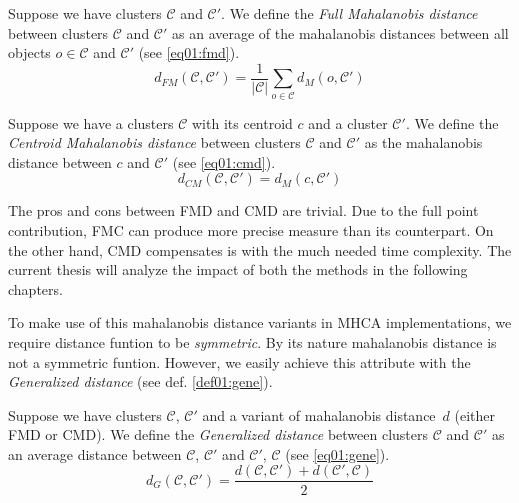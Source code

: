 \begin{defn}
	Suppose we have clusters $\mathcal{C}$ and $\mathcal{C}'$. We define the \emph{Full Mahalanobis distance} between clusters $\mathcal{C}$ and $\mathcal{C}'$ as an average of the mahalanobis distances between all objects $o \in \mathcal{C}$ and $\mathcal{C}'$ (see \ref{eq01:fmd}).
	\begin{equation}\label{eq01:fmd}
	d_{FM}(\mathcal{C},\mathcal{C}') =\frac{1}{|\mathcal{C}|}\sum_{o\in\mathcal{C}}{d_M(o,\mathcal{C}')}
	\end{equation}
	\label{def01:fmd}
\end{defn}

\begin{defn}
	Suppose we have a clusters $\mathcal{C}$ with its centroid $c$ and a cluster $\mathcal{C}'$. We define the \emph{Centroid Mahalanobis distance} between clusters $\mathcal{C}$ and $\mathcal{C}'$ as the mahalanobis distance between $c$ and $\mathcal{C}'$ (see \ref{eq01:cmd}).
	\begin{equation}\label{eq01:cmd}
	d_{CM}(\mathcal{C},\mathcal{C}')=d_M(c,\mathcal{C}')
	\end{equation}
	\label{def01:cmd}
\end{defn}


The pros and cons between FMD and CMD are trivial. Due to the full point contribution, FMC can produce more precise measure than its counterpart. On the other hand, CMD compensates is with the much needed time complexity. The current thesis will analyze the impact of both the methods in the following chapters.

\vspace{0.5cm}

To make use of this mahalanobis distance variants in MHCA implementations, we require distance funtion to be \emph{symmetric}. By its nature mahalanobis distance is not a symmetric funtion. However, we easily achieve this attribute with the \emph{Generalized distance} (see def. \ref{def01:gene}).

\begin{defn}
	Suppose we have clusters $\mathcal{C}$, $\mathcal{C}'$ and a variant of mahalanobis distance~$d$ (either FMD or CMD). We define the \emph{Generalized distance} between clusters $\mathcal{C}$ and $\mathcal{C}'$ as an average distance between $\mathcal{C}$, $\mathcal{C}'$ and $\mathcal{C}'$, $\mathcal{C}$ (see \ref{eq01:gene}).
	\begin{equation}\label{eq01:gene}
	d_G(\mathcal{C},\mathcal{C}') = \frac{d(\mathcal{C},\mathcal{C}')+d(\mathcal{C}',\mathcal{C})}{2}
	\end{equation}
	\label{def01:gene}
\end{defn}  


